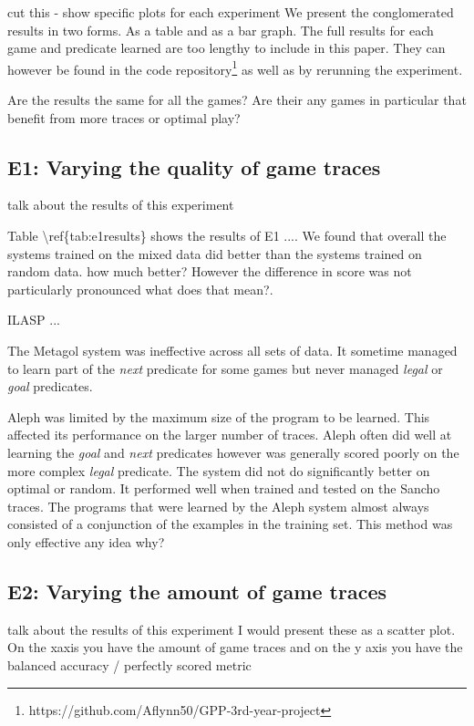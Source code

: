 \ac{cut this - show specific plots for each experiment}
We present the conglomerated results in two forms. As a table and as a bar graph. The full results for each game and predicate learned are too lengthy to include in this paper. They can however be found in the code repository\footnote{https://github.com/Aflynn50/GPP-3rd-year-project} as well as by rerunning the experiment.



\ac{
	Are the results the same for all the games?
	Are their any games in particular that benefit from more traces or optimal play?
}

\subsection{E1: Varying the quality of game traces}
\ac{talk about the results of this experiment}



\ac{Table \ref{tab:e1results} shows the results of E1 ....}
We found that overall the systems trained on the mixed data did better than the systems trained on random data.
\ac{how much better?}
However the difference in score was not particularly pronounced \ac{what does that mean?}.

\ac{ILASP ...}

The Metagol system was ineffective across all sets of data. It sometime managed to learn part of the \textit{next} predicate for some games but never managed \textit{legal} or \textit{goal} predicates.

Aleph was limited by the maximum size of the program to be learned. This affected its performance on the larger number of traces. Aleph often did well at learning the \textit{goal} and \textit{next} predicates however was generally scored poorly on the more complex \textit{legal} predicate. The system did not do significantly better on optimal or random. It performed well when trained and tested on the Sancho traces.
The programs that were learned by the Aleph system almost always consisted of a conjunction of the examples in the training set. This method was only effective \ac{any idea why?}


\subsection{E2: Varying the amount of game traces}
\ac{talk about the results of this experiment}
\ac{
	I would present these as a scatter plot. On the xaxis you have the amount of game traces and on the y axis you have the balanced accuracy / perfectly scored metric
}


